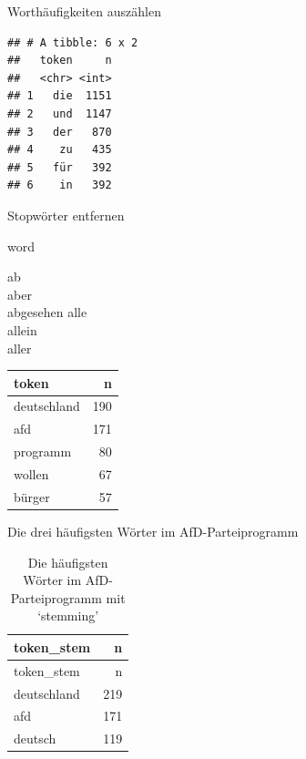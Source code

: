 \begin{frame}[fragile]{Worthäufigkeiten auszählen}

\begin{Shaded}
\end{Shaded}

\begin{verbatim}
## # A tibble: 6 x 2
##   token     n
##   <chr> <int>
## 1   die  1151
## 2   und  1147
## 3   der   870
## 4    zu   435
## 5   für   392
## 6    in   392
\end{verbatim}

\end{frame}

\begin{frame}{Stopwörter entfernen}

\end{frame}

\begin{frame}{word}

ab\\
aber\\
abgesehen alle\\
allein\\
aller

\begin{longtable}[]{@{}lr@{}}
\toprule
token & n\tabularnewline
\midrule
\endhead
deutschland & 190\tabularnewline
afd & 171\tabularnewline
programm & 80\tabularnewline
wollen & 67\tabularnewline
bürger & 57\tabularnewline
\bottomrule
\end{longtable}

\end{frame}

\begin{frame}{Die drei häufigsten Wörter im AfD-Parteiprogramm}

\begin{longtable}[]{@{}lr@{}}
\caption{Die häufigsten Wörter im AfD-Parteiprogramm mit
`stemming'}\tabularnewline
\toprule
token\_stem & n\tabularnewline
\midrule
\endfirsthead
\toprule
token\_stem & n\tabularnewline
\midrule
\endhead
deutschland & 219\tabularnewline
afd & 171\tabularnewline
deutsch & 119\tabularnewline
\bottomrule
\end{longtable}

\end{frame}

